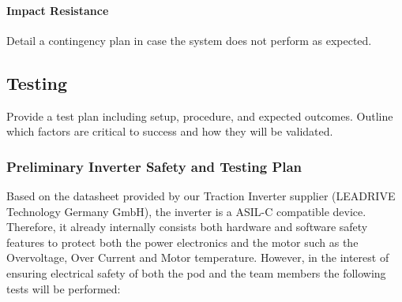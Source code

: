 \paragraph{Impact Resistance}
Detail a contingency plan in case the system does not perform as expected.


\subsection{Testing}
Provide a test plan including setup, procedure, and expected outcomes.
Outline which factors are critical to success and how they will be validated.
\subsubsection{Preliminary Inverter Safety and Testing Plan}
Based on the datasheet provided by our Traction Inverter supplier (LEADRIVE Technology Germany GmbH), the inverter is a ASIL-C compatible device. Therefore, it already internally consists both hardware and software safety features to protect both the power electronics and the motor such as the Overvoltage, Over Current and Motor temperature. However, in the interest of ensuring electrical safety of both the pod and the team members the following tests will be performed:


